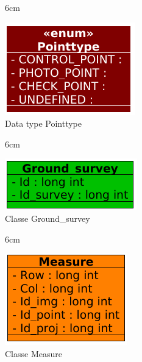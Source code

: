 \begin{figure}[!ht]{6cm}
  \caption{Data type Pointtype} \label{pointype}
  \centering
  \includegraphics[width=0.8\hsize]{figuras/24.png}
\end{figure}

\begin{figure}[!ht]{6cm}
  \caption{Classe Ground\_survey} \label{gp}
  \centering
  \includegraphics[width=0.8\hsize]{figuras/27.png}
\end{figure}

\begin{figure}[!ht]{6cm}
  \caption{Classe Measure} \label{meas}
  \centering
  \includegraphics[width=0.6\hsize]{figuras/21.png}
\end{figure}

